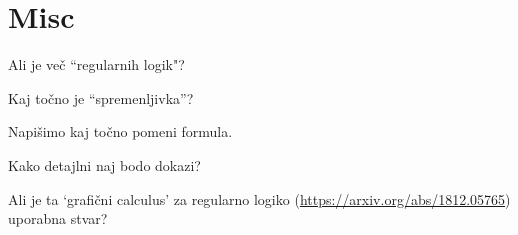 \documentclass[12pt,a4paper]{article}
\newcommand\ans{\item[\textbf{A:}]}
\begin{document}
    \section*{Misc}
    \begin{vprasanja}
        \item Ali je več ``regularnih logik"?
        \ans
        \item Kaj točno je ``spremenljivka''?
        \ans
        \item Napišimo kaj točno pomeni formula.
        \ans
        \item Kako detajlni naj bodo dokazi?
        \ans
        \item Ali je ta `grafični calculus' za regularno logiko (\url{https://arxiv.org/abs/1812.05765}) uporabna stvar?
        \ans
    \end{vprasanja}
\end{document}
